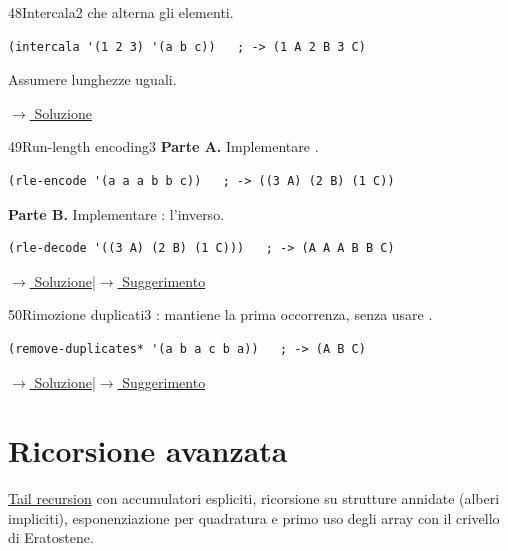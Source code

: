 \label{ex:48}
\begin{colbox}{48}{Intercala}{2}
  che alterna gli elementi.
\nopagebreak
\begin{lstlisting}
(intercala '(1 2 3) '(a b c))   ; -> (1 A 2 B 3 C)
\end{lstlisting}
Assumere lunghezze uguali.


\small\color{black!55}\hyperref[sol:48]{$\rightarrow$ Soluzione}\normalsize\color{black}
\end{colbox}

\label{ex:49}
\begin{stdbox}{49}{Run-length encoding}{3}
\textbf{Parte A.} Implementare .
\begin{lstlisting}
(rle-encode '(a a a b b c))   ; -> ((3 A) (2 B) (1 C))
\end{lstlisting}
\textbf{Parte B.} Implementare : l'inverso.
\begin{lstlisting}
(rle-decode '((3 A) (2 B) (1 C)))   ; -> (A A A B B C)
\end{lstlisting}


\small\color{black!55}\hyperref[sol:49]{$\rightarrow$ Soluzione}\enspace\textcolor{black!30}{|}\enspace\hyperref[hint:49]{$\rightarrow$ Suggerimento}\normalsize\color{black}
\end{stdbox}

\label{ex:50}
\begin{colbox}{50}{Rimozione duplicati}{3}
 : mantiene la prima
occorrenza, senza usare .
\begin{lstlisting}
(remove-duplicates* '(a b a c b a))   ; -> (A B C)
\end{lstlisting}


\small\color{black!55}\hyperref[sol:50]{$\rightarrow$ Soluzione}\enspace\textcolor{black!30}{|}\enspace\hyperref[hint:50]{$\rightarrow$ Suggerimento}\normalsize\color{black}
\end{colbox}

\setcounter{section}{2}
\section{Ricorsione avanzata}

\noindent
\hyperref[nota:tailrec]{Tail recursion} con accumulatori espliciti, ricorsione su strutture
annidate (alberi impliciti), esponenziazione per quadratura
e primo uso degli array con il crivello di Eratostene.

